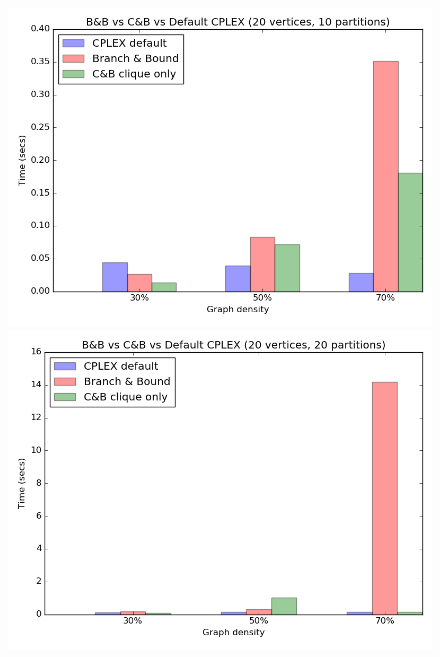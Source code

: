 \begin{figure}[h]
  \centering
  \begin{minipage}[b]{0.49\textwidth}
    \includegraphics[width=\textwidth]{img/8-compare_v20_p10_i1_l40_t1_b0.png}
  \end{minipage}
  \hfill
  \begin{minipage}[b]{0.49\textwidth}
    \includegraphics[width=\textwidth]{img/8-compare_v20_p20_i1_l40_t1_b0.png}
  \end{minipage}
  \begin{minipage}[b]{0.49\textwidth}

\end{minipage}
\end{figure}
